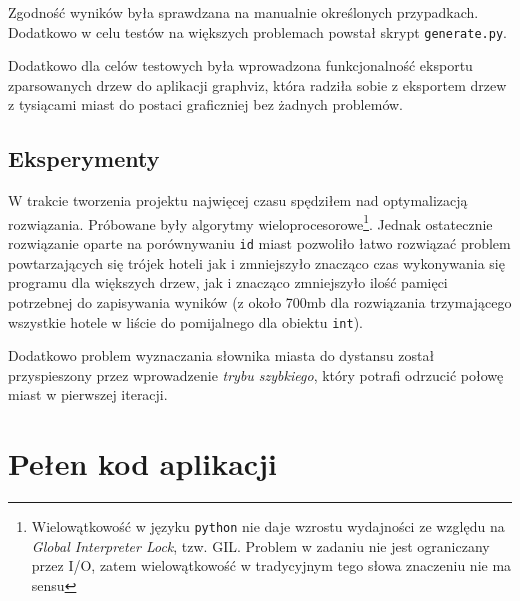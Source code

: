 \documentclass[12pt,a4paper]{article}
\begin{document}
    Zgodność wyników była sprawdzana na manualnie określonych przypadkach.
    Dodatkowo w celu testów na większych problemach powstał skrypt
    \texttt{generate.py}.

    Dodatkowo dla celów testowych była wprowadzona funkcjonalność eksportu
    zparsowanych drzew do aplikacji graphviz, która radziła sobie z eksportem
    drzew z tysiącami miast do postaci graficzniej bez żadnych problemów.
	
	\subsection*{Eksperymenty}

    W trakcie tworzenia projektu najwięcej czasu spędziłem nad optymalizacją
    rozwiązania. Próbowane były algorytmy wieloprocesorowe\footnote{Wielowątkowość
    w języku \texttt{python} nie daje wzrostu wydajności ze względu na
    \emph{Global Interpreter Lock}, tzw. GIL. Problem w zadaniu nie jest
    ograniczany przez I/O, zatem wielowątkowość w tradycyjnym tego słowa
    znaczeniu nie ma sensu}. Jednak ostatecznie rozwiązanie
    oparte na porównywaniu \texttt{id} miast pozwoliło łatwo rozwiązać problem
    powtarzających się trójek hoteli jak i zmniejszyło znacząco czas
    wykonywania się programu dla większych drzew, jak i znacząco zmniejszyło
    ilość pamięci potrzebnej do zapisywania wyników (z około 700mb dla
    rozwiązania trzymającego wszystkie hotele w liście do pomijalnego dla
    obiektu \texttt{int}). 

    Dodatkowo problem wyznaczania słownika miasta do dystansu został
    przyspieszony przez wprowadzenie \emph{trybu szybkiego}, który potrafi
    odrzucić połowę miast w pierwszej iteracji.


    \newpage
	\section*{Pełen kod aplikacji}




\end{document}
